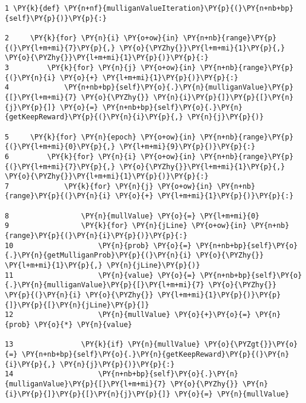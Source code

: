\begin{Verbatim}[commandchars=\\\{\}]
1 \PY{k}{def} \PY{n+nf}{mulliganValueIteration}\PY{p}{(}\PY{n+nb+bp}{self}\PY{p}{)}\PY{p}{:}

2     \PY{k}{for} \PY{n}{i} \PY{o+ow}{in} \PY{n+nb}{range}\PY{p}{(}\PY{l+m+mi}{7}\PY{p}{,} \PY{o}{\PYZhy{}}\PY{l+m+mi}{1}\PY{p}{,} \PY{o}{\PYZhy{}}\PY{l+m+mi}{1}\PY{p}{)}\PY{p}{:}
3         \PY{k}{for} \PY{n}{j} \PY{o+ow}{in} \PY{n+nb}{range}\PY{p}{(}\PY{n}{i} \PY{o}{+} \PY{l+m+mi}{1}\PY{p}{)}\PY{p}{:}
4             \PY{n+nb+bp}{self}\PY{o}{.}\PY{n}{mulliganValue}\PY{p}{[}\PY{l+m+mi}{7} \PY{o}{\PYZhy{}} \PY{n}{i}\PY{p}{]}\PY{p}{[}\PY{n}{j}\PY{p}{]} \PY{o}{=} \PY{n+nb+bp}{self}\PY{o}{.}\PY{n}{getKeepReward}\PY{p}{(}\PY{n}{i}\PY{p}{,} \PY{n}{j}\PY{p}{)}

5     \PY{k}{for} \PY{n}{epoch} \PY{o+ow}{in} \PY{n+nb}{range}\PY{p}{(}\PY{l+m+mi}{0}\PY{p}{,} \PY{l+m+mi}{9}\PY{p}{)}\PY{p}{:}
6         \PY{k}{for} \PY{n}{i} \PY{o+ow}{in} \PY{n+nb}{range}\PY{p}{(}\PY{l+m+mi}{7}\PY{p}{,} \PY{o}{\PYZhy{}}\PY{l+m+mi}{1}\PY{p}{,} \PY{o}{\PYZhy{}}\PY{l+m+mi}{1}\PY{p}{)}\PY{p}{:}
7             \PY{k}{for} \PY{n}{j} \PY{o+ow}{in} \PY{n+nb}{range}\PY{p}{(}\PY{n}{i} \PY{o}{+} \PY{l+m+mi}{1}\PY{p}{)}\PY{p}{:}

8                 \PY{n}{mullValue} \PY{o}{=} \PY{l+m+mi}{0}
9                 \PY{k}{for} \PY{n}{jLine} \PY{o+ow}{in} \PY{n+nb}{range}\PY{p}{(}\PY{n}{i}\PY{p}{)}\PY{p}{:}
10                    \PY{n}{prob} \PY{o}{=} \PY{n+nb+bp}{self}\PY{o}{.}\PY{n}{getMulliganProb}\PY{p}{(}\PY{n}{i} \PY{o}{\PYZhy{}} \PY{l+m+mi}{1}\PY{p}{,} \PY{n}{jLine}\PY{p}{)}
11                    \PY{n}{value} \PY{o}{=} \PY{n+nb+bp}{self}\PY{o}{.}\PY{n}{mulliganValue}\PY{p}{[}\PY{l+m+mi}{7} \PY{o}{\PYZhy{}} \PY{p}{(}\PY{n}{i} \PY{o}{\PYZhy{}} \PY{l+m+mi}{1}\PY{p}{)}\PY{p}{]}\PY{p}{[}\PY{n}{jLine}\PY{p}{]}
12                    \PY{n}{mullValue} \PY{o}{+}\PY{o}{=} \PY{n}{prob} \PY{o}{*} \PY{n}{value}

13                \PY{k}{if} \PY{n}{mullValue} \PY{o}{\PYZgt{}}\PY{o}{=} \PY{n+nb+bp}{self}\PY{o}{.}\PY{n}{getKeepReward}\PY{p}{(}\PY{n}{i}\PY{p}{,} \PY{n}{j}\PY{p}{)}\PY{p}{:}
14                    \PY{n+nb+bp}{self}\PY{o}{.}\PY{n}{mulliganValue}\PY{p}{[}\PY{l+m+mi}{7} \PY{o}{\PYZhy{}} \PY{n}{i}\PY{p}{]}\PY{p}{[}\PY{n}{j}\PY{p}{]} \PY{o}{=} \PY{n}{mullValue}
\end{Verbatim}
